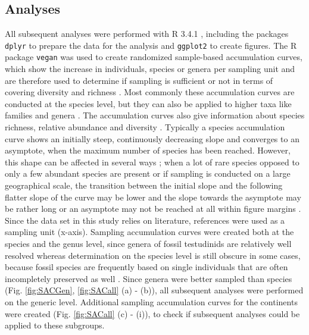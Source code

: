 \subsection{Analyses}
All subsequent analyses were performed with R 3.4.1 \citep{RCoreTeam2017}, including the packages \texttt{dplyr} \citep{Wickham2017} to prepare the data for the analysis and \texttt{ggplot2} \citep{Wickham2009} to create figures. The R package \texttt{vegan} \citep{Oksanen2017} was used to create randomized sample-based accumulation curves, which show the increase in individuals, species or genera per sampling unit and are therefore used to determine if sampling is sufficient or not in terms of covering diversity and richness \citep{Thompson2002}. Most commonly these accumulation curves are conducted at the species level, but they can also be applied to higher taxa like families and genera \citep{Gotelli2011, Gotelli2001}. The accumulation curves also give information about species richness, relative abundance and diversity \citep{Thompson2002}. Typically a species accumulation curve shows an initially steep, continuously decreasing slope and converges to an asymptote, when the maximum number of species has been reached. However, this shape can be affected in several ways \citep{Gotelli2011, Gotelli2001}; when a lot of rare species opposed to only a few abundant species are present or if sampling is conducted on a large geographical scale, the transition between the initial slope and the following flatter slope of the curve may be lower and the slope towards the asymptote may be rather long or an asymptote may not be reached at all within figure margins .
Since the data set in this study relies on literature, references were used as a sampling unit (x-axis). %
Sampling accumulation curves were created both at the species and the genus level, since genera of fossil testudinids are relatively well resolved whereas determination on the species level is still obscure in some cases, because fossil species are frequently based on single individuals that are often incompletely preserved as well \citep{Brattstrom1961, DeLapparentdeBroin2001}. Since genera were better sampled than species (Fig. \ref{fig:SACGen}, \ref{fig:SACall} (a) - (b)), all subsequent analyses were performed on the generic level.
Additional sampling accumulation curves for the continents were created (Fig. \ref{fig:SACall} (c) -  (i)), to check if subsequent analyses could be applied to these subgroups. 

